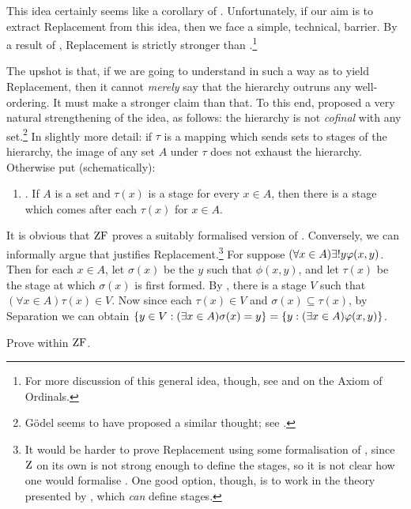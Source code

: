 \documentclass[../../../include/open-logic-section]{subfiles}
\begin{document}
This idea certainly seems like a corollary of \stagesinex.
Unfortunately, if our aim is to extract Replacement from this idea,
then we face a simple, technical, barrier. By a result of
\citet{Montague1961}, Replacement is strictly stronger than
.\footnote{For more
discussion of this general idea, though, see
\citet[\S13.2]{Potter2004} and \citet{IncurvatiThesis} on the Axiom of
Ordinals.}

The upshot is that, if we are going to understand \stagesinex{} in
such a way as to yield Replacement, then it cannot \emph{merely} say
that the hierarchy outruns any well-ordering. It must make a stronger
claim than that. To this end, \cite{Shoenfield:AST} proposed a very
natural strengthening of the idea, as follows: the hierarchy is not
\emph{cofinal} with any set.\footnote{G\"odel seems to have proposed a
similar thought; see \cite[p.~223]{Potter2004}.} In slightly more detail:
if $\tau$ is a mapping which sends sets to stages of the hierarchy,
the image of any set $A$ under $\tau$ does not exhaust the hierarchy.
Otherwise put (schematically): 
\begin{enumerate}
	\item[] \stagescofin. If $A$ is a set and $\tau(x)$ is a stage for
	every $x \in A$, then there is a stage which comes after each
	$\tau(x)$ for $x \in A$.
\end{enumerate}
It is obvious that $\mathrm{ZF}$ proves a suitably formalised version of
\stagescofin. Conversely, we can informally argue that \stagescofin{}
justifies Replacement.\footnote{It would be harder to prove
Replacement using some formalisation of \stagescofin, since $\mathrm{Z}$ on
its own is not strong enough to define the stages, so it is not clear
how one would formalise \stagescofin. One good option, though, is to
work in the theory presented by \cite{Potter2004}, which \emph{can}
define stages.} For suppose $(\forall x \in A)\exists \bang
y\phi(x,y)$. Then for each $x \in A$, let $\sigma(x)$ be the $y$ such
that $\phi(x,y)$, and let $\tau(x)$ be the stage at which $\sigma(x)$
is first formed. By \stagescofin, there is a stage $V$ such that
$(\forall x \in A)\tau(x)\in V$. Now since each $\tau(x) \in V$ and
$\sigma(x) \subseteq \tau(x)$, by Separation we can obtain $\{ y
\in V : (\exists x \in A)\sigma(x) = y \} = \{ y : (\exists x \in
A)\varphi(x,y) \}$.

\begin{prob}
Prove \stagescofin{} within $\mathrm{ZF}$.
\end{prob}
\end{document}
